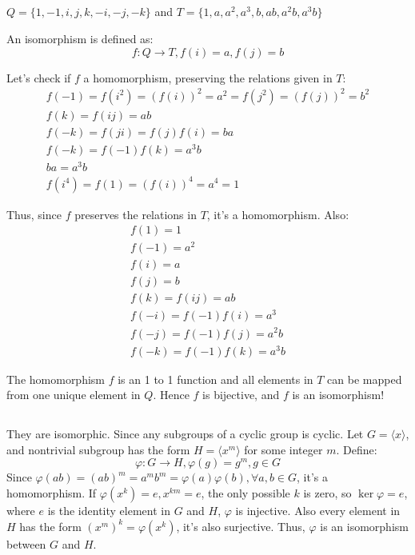 \documentclass[12pt]{article}
\begin{document}
\subsection{} %
$Q=\{1, -1, i, j, k, -i, -j, -k\}$ and $T=\{1,a,a^2,a^3,b,ab,a^2b,a^3b\}$

An isomorphism is defined as:
$$f:Q\rightarrow T, f(i)=a,f(j)=b$$

Let's check if $f$ a homomorphism, preserving the relations given in $T$:
\begin{align*}
f(-1)=f(i^2)=(f(i))^2=a^2=f(j^2)=(f(j))^2=b^2 \\
f(k)=f(ij)=ab \\
f(-k)=f(ji)=f(j)f(i)=ba \\
f(-k)=f(-1)f(k)=a^3b \\
ba=a^3b \\
f(i^4)=f(1)=(f(i))^4=a^4=1
\end{align*}

Thus, since $f$ preserves the relations in $T$, it's a homomorphism. Also:
\begin{align*}
f(1)=1 \\
f(-1)=a^2 \\
f(i)=a \\
f(j)=b \\
f(k)=f(ij)=ab\\
f(-i)=f(-1)f(i)=a^3\\
f(-j)=f(-1)f(j)=a^2b\\
f(-k)=f(-1)f(k)=a^3b
\end{align*}

The homomorphism $f$ is an 1 to 1 function and all elements in $T$ can be mapped from one unique element in $Q$. Hence $f$ is bijective, and $f$ is an isomorphism!

\subsection{} %
They are isomorphic. Since any subgroups of a cyclic group is cyclic. Let $G=\langle x\rangle$, and nontrivial subgroup has the form $H=\langle x^m\rangle$ for some integer $m$. Define:
$$\varphi:G\rightarrow H,\varphi(g)=g^{m},g\in G$$ 
Since $\varphi(ab)=(ab)^{m}=a^mb^m=\varphi(a)\varphi(b),\forall a,b\in G$, it's a homomorphism. If $\varphi(x^k)=e, x^{km}=e$, the only possible $k$ is zero, so $\ker\varphi=e$, where $e$ is the identity element in $G$ and $H$, $\varphi$ is injective. Also every element in $H$ has the form $(x^m)^k=\varphi(x^k)$, it's also surjective. Thus, $\varphi$ is an isomorphism between $G$ and $H$.
\newpage
\end{document}
